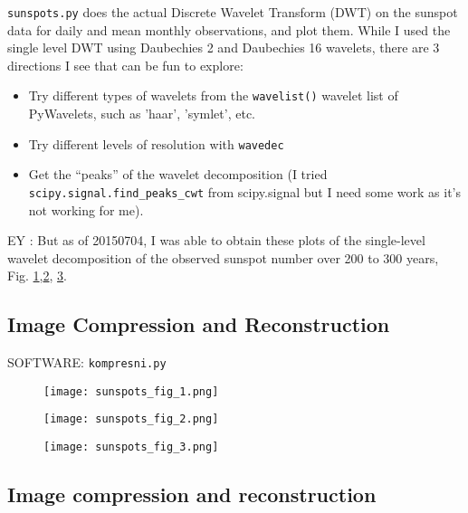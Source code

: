 \documentclass[twoside]{amsart}
\theoremstyle{plain}
\theoremstyle{definition}
\theoremstyle{remark}
\numberwithin{equation}{section}
\begin{document}
\verb|sunspots.py| does the actual Discrete Wavelet Transform (DWT) on the sunspot data for daily and mean monthly observations, and plot them.  While I used the single level DWT using Daubechies 2 and Daubechies 16 wavelets, there are 3 directions I see that can be fun to explore:
\begin{itemize}
  \item Try different types of wavelets from the \verb|wavelist()| wavelet list of PyWavelets, such as 'haar', 'symlet', etc.
  \item Try different levels of resolution with \verb|wavedec|
  \item Get the ``peaks'' of the wavelet decomposition (I tried \verb|scipy.signal.find_peaks_cwt| from scipy.signal but I need some work as it's not working for me).  
\end{itemize}

EY : But as of 20150704, I was able to obtain these plots of the single-level wavelet decomposition of the observed sunspot number over 200 to 300 years, Fig. \ref{Fig:sunspots_fig_1},\ref{Fig:sunspots_fig_2}, \ref{Fig:sunspots_fig_3}.

\subsection{Image Compression and Reconstruction}

SOFTWARE: \verb|kompresni.py|

\begin{figure}[h!]\label{Fig:sunspots_fig_1}
 \centering
   \texttt{[image: sunspots\_fig\_1.png]}
\end{figure}

\begin{figure}[h!]\label{Fig:sunspots_fig_2}
 \centering
   \texttt{[image: sunspots\_fig\_2.png]}
\end{figure}

\begin{figure}[h!]\label{Fig:sunspots_fig_3}
 \centering
   \texttt{[image: sunspots\_fig\_3.png]}
\end{figure}


\subsection{Image compression and reconstruction}
\end{document}
